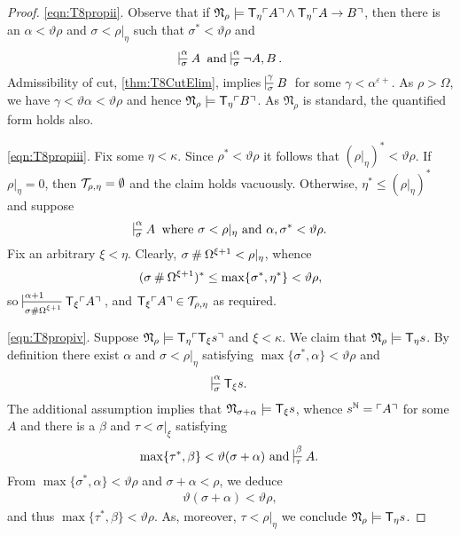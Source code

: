 \documentclass[UKenglish,cleveref,DIV=12]{scrartcl}
\theoremstyle{definition}
\theoremstyle{definition}
\begin{document}
\begin{proof}

\ref{eqn:T8propii}. Observe that if $\mathfrak N_\rho\models \mathsf{T}_\eta \ulcorner{A}\urcorner \land \mathsf{T}_\eta \ulcorner{A\rightarrow B}\urcorner$, then there is an $\alpha<\vartheta\rho$ and $\sigma<\rho|_\eta$ such that $\sigma^*<\vartheta\rho$ and
\[
 \prov{\alpha}\sigma{A}\text{ and }\prov{\alpha}\sigma{\lnot A,B}.
\]
Admissibility of cut, \cref{thm:T8CutElim}, implies $\prov{\gamma}\sigma{B}$ for some $\gamma<\alpha^{\varepsilon+}$. 
As $\rho>\Omega$, we have $\gamma<\vartheta\alpha<\vartheta\rho$ and hence $\mathfrak N_\rho\models \mathsf{T}_\eta \ulcorner{B}\urcorner$.
As \( \mathfrak N_\rho \) is standard, the quantified form holds also.

\ref{eqn:T8propiii}. Fix some $\eta<\kappa$. Since \( \rho^* < \vartheta \rho \) it follows that $(\rho|_\eta)^*<\vartheta\rho$. 
If $\rho|_\eta=0$, then \( \mathcal{T}_{\rho,\eta} = \emptyset \) and the claim holds vacuously.  
Otherwise, $\eta^*\le(\rho|_\eta)^*$ and suppose 
\[ \prov\alpha\sigma A \text{ where $\sigma<\rho|_\eta$ and $\alpha,\sigma^*<\vartheta\rho$.}
\]
Fix an arbitrary \( \xi < \eta \).
Clearly, $\sigma\mathbin{\#}\Omega^{\xi+1}<\rho|_\eta$, whence 
\[(\sigma\mathbin{\#}\Omega^{\xi+1})^*\le\max\{\sigma^*,\eta^*\}<\vartheta\rho, \]
so \( \prov {\alpha+1}{\sigma \nsum \Omega^{\xi +1}} {\T_\xi\gn A } \), and ${\mathsf{T}_\xi \ulcorner{A}\urcorner } \in \mathcal{T}_{\rho,\eta}$ as required.

\ref{eqn:T8propiv}. Suppose $ \mathfrak N_\rho\models \mathsf{T}_\eta \ulcorner{\mathsf{T}_\xi s}\urcorner $ and $\xi<\kappa$.
We claim that $\mathfrak N_\rho\models \mathsf{T}_\eta s$. 
By definition there exist $\alpha$ and $\sigma<\rho|_\eta$ satisfying $ \max\{ \sigma^*,\alpha \} < \vartheta\rho$ and
\begin{align*}%
 \prov{\alpha}{\sigma}{\T_\xi s.}
\end{align*}
The additional assumption implies that $\mathfrak N_{\sigma+\alpha}\models \mathsf{T}_\xi s$, whence $s^\mathbb N=\ulcorner{A}\urcorner$ for some $A$ and there is a $\beta$ and $\tau<\sigma|_\xi$ satisfying
\[
	\max\{ \tau^*,\beta \} <\vartheta(\sigma+\alpha) \text{ and } \prov\beta\tau {A.}
\]
From $\max\{ \sigma^*,\alpha \} <\vartheta\rho$ and $\sigma+\alpha<\rho$, we deduce
\begin{align*}
  \vartheta(\sigma+\alpha)< \vartheta\rho,
\end{align*}
and thus $ \max\{ \tau^*,\beta \}<\vartheta\rho$. As, moreover, $\tau<\rho|_\eta$ we conclude $\mathfrak N_\rho\models \mathsf{T}_\eta s$.



\end{proof}
\end{document}
